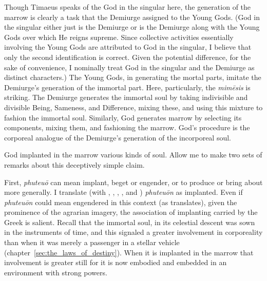 Though Timaeus speaks of the God in the singular here, the generation of the marrow is clearly a task that the Demiurge assigned to the Young Gods. (God in the singular either just is the Demiurge or is the Demiurge along with the Young Gods over which He reigns supreme. Since collective activities essentially involving the Young Gods are attributed to God in the singular, I believe that only the second identification is correct. Given the potential difference, for the sake of convenience, I nominally treat God in the singular and the Demiurge as distinct characters.) The Young Gods, in generating the mortal parts, imitate the Demiurge's generation of the immortal part. Here, particularly, the \emph{mimēsis} is striking. The Demiurge generates the immortal soul by taking indivisible and divisible Being, Sameness, and Difference, mixing these, and using this mixture to fashion the immortal soul. Similarly, God generates marrow by selecting its components, mixing them, and fashioning the marrow. God's procedure is the corporeal analogue of the Demiurge's generation of the incorporeal soul.

God implanted in the marrow various kinds of soul. Allow me to make two sets of remarks about this deceptively simple claim.

First, \emph{phuteuō} can mean implant, beget or engender, or to produce or bring about more generally. I translate (with \citealt[271]{Archer-Hind:1888qd}, \citealt[293]{Cornford:1935fk}, \citealt[70]{Lee:2008ca}, \citealt[77]{Taylor:1929ov} \citealt[73]{Waterfield:2003gs}, and \citealt[67]{Zeyl:2000cs}) \emph{phuteuōn} as implanted. Even if \emph{phuteuōn} could mean engendered in this context (as \citealt[191--3]{Bury:1929jb} translates), given the prominence of the agrarian imagery, the association of implanting carried by the Greek is salient. Recall that the immortal soul, in its celestial descent was sown in the instruments of time, and this signaled a greater involvement in corporeality than when it was merely a passenger in a stellar vehicle (chapter~\ref{sec:the_laws_of_destiny}). When it is implanted in the marrow that involvement is greater still for it is now embodied and embedded in an environment with strong powers.

